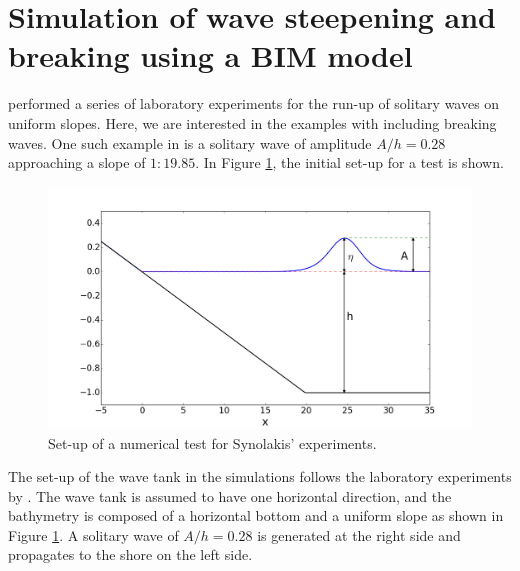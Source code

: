 \documentclass[review]{elsarticle}
\begin{document}

\section{Simulation of wave steepening and breaking using a BIM model}
\label{sec:wave_break}



\citet{synolakis1987runup} performed a series of laboratory experiments for the run-up of solitary waves
on uniform slopes. Here, we are interested in the examples with including breaking waves. 
One such example in \citet{synolakis1987runup} is a solitary wave of amplitude $A/h=0.28$ 
approaching a slope of $1:19.85$. In Figure \ref{fig:init_setup}, the initial set-up for a test is shown. 

\begin{figure}[!htb]
\centering
\includegraphics[width=.7\textwidth]{_fig/initial_setup.png}
\caption{Set-up of a numerical test for Synolakis' experiments.}
\label{fig:init_setup}
\end{figure}

The set-up of the wave tank in the simulations follows the laboratory experiments by \citep{synolakis1987runup}. 
The wave tank is assumed to have one horizontal direction,
and the bathymetry is composed of a horizontal bottom and 
a uniform slope as shown in Figure \ref{fig:init_setup}. 
A solitary wave of $A/h=0.28$ is generated at the right side
and propagates to the shore on the left side. 
\end{document}

